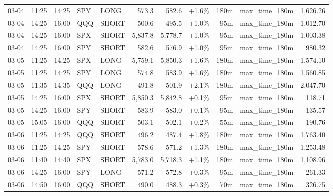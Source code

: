 \documentclass[11pt,a4paper,twoside]{article}
\begin{document}
\begin{center}
\begin{longtable}{>{\color{txtmain}}l l l l l r r r r >{\color{txtmain}}l r}
03-04 & 11:25 & 14:25 & SPY & LONG & 573.3 & 582.6 & \textcolor{wingreen}{+1.6\%} & 180m & max\_time\_180m & \textcolor{wingreen}{1,626.26} \\
03-04 & 14:25 & 16:00 & QQQ & SHORT & 500.6 & 495.5 & \textcolor{wingreen}{+1.0\%} & 95m & max\_time\_180m & \textcolor{wingreen}{1,012.70} \\
03-04 & 14:25 & 16:00 & SPX & SHORT & 5,837.8 & 5,778.7 & \textcolor{wingreen}{+1.0\%} & 95m & max\_time\_180m & \textcolor{wingreen}{1,003.38} \\
03-04 & 14:25 & 16:00 & SPY & SHORT & 582.6 & 576.9 & \textcolor{wingreen}{+1.0\%} & 95m & max\_time\_180m & \textcolor{wingreen}{980.32} \\
03-05 & 11:25 & 14:25 & SPX & LONG & 5,759.1 & 5,850.3 & \textcolor{wingreen}{+1.6\%} & 180m & max\_time\_180m & \textcolor{wingreen}{1,574.10} \\
03-05 & 11:25 & 14:25 & SPY & LONG & 574.8 & 583.9 & \textcolor{wingreen}{+1.6\%} & 180m & max\_time\_180m & \textcolor{wingreen}{1,560.85} \\
03-05 & 11:35 & 14:35 & QQQ & LONG & 491.8 & 501.9 & \textcolor{wingreen}{+2.1\%} & 180m & max\_time\_180m & \textcolor{wingreen}{2,047.70} \\
03-05 & 14:25 & 16:00 & SPX & SHORT & 5,850.3 & 5,842.8 & \textcolor{wingreen}{+0.1\%} & 95m & max\_time\_180m & \textcolor{wingreen}{118.71} \\
03-05 & 14:25 & 16:00 & SPY & SHORT & 583.9 & 583.0 & \textcolor{wingreen}{+0.1\%} & 95m & max\_time\_180m & \textcolor{wingreen}{135.57} \\
03-05 & 15:05 & 16:00 & QQQ & SHORT & 503.1 & 502.1 & \textcolor{wingreen}{+0.2\%} & 55m & max\_time\_180m & \textcolor{wingreen}{190.76} \\
03-06 & 11:25 & 14:25 & QQQ & SHORT & 496.2 & 487.4 & \textcolor{wingreen}{+1.8\%} & 180m & max\_time\_180m & \textcolor{wingreen}{1,763.40} \\
03-06 & 11:25 & 14:25 & SPY & SHORT & 578.6 & 571.2 & \textcolor{wingreen}{+1.3\%} & 180m & max\_time\_180m & \textcolor{wingreen}{1,253.48} \\
03-06 & 11:40 & 14:40 & SPX & SHORT & 5,783.0 & 5,718.3 & \textcolor{wingreen}{+1.1\%} & 180m & max\_time\_180m & \textcolor{wingreen}{1,108.96} \\
03-06 & 14:25 & 16:00 & SPY & LONG & 571.2 & 572.8 & \textcolor{wingreen}{+0.3\%} & 95m & max\_time\_180m & \textcolor{wingreen}{261.33} \\
03-06 & 14:50 & 16:00 & QQQ & SHORT & 490.0 & 488.3 & \textcolor{wingreen}{+0.3\%} & 70m & max\_time\_180m & \textcolor{wingreen}{326.75} \\

\end{longtable}
\end{center}
\end{document}
